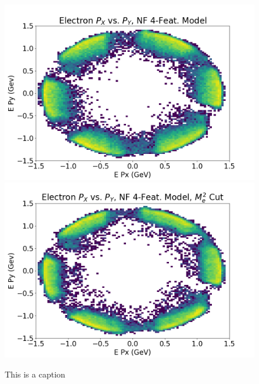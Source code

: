 \begin{figure}[!ht]
\begin{minipage}{0.23\textwidth}
    \end{minipage}
     \begin{minipage}{0.23\textwidth}
        \centering
        \includegraphics[width=.99\textwidth,trim={0 0 0 0},clip]{FinalPictures/2D_Hists_4F/Electron_P_X_vs_P_Y,_NF_4-Feat_Model.png}
        \includegraphics[width=.99\textwidth,trim={0 0 0 0},clip]{FinalPictures/2D_Hists_4F/Electron_P_X_vs_P_Y,_NF_4-Feat_Model,_M_e2_Cut.png}
    \end{minipage}
    \caption{This is a caption}
    \label{fig:a}
\end{figure}



